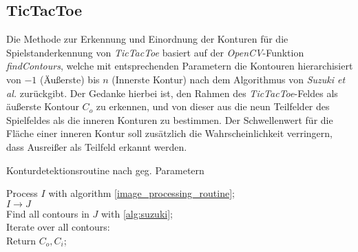 \subsection{TicTacToe}
Die Methode zur Erkennung und Einordnung der Konturen für die Spielstanderkennung von \textit{TicTacToe} basiert auf der \textit{OpenCV}-Funktion \textit{findContours}, welche mit entsprechenden Parametern die Kontouren hierarchisiert von $-1$ (Äußerste) bis $n$ (Innerste Kontur) nach dem Algorithmus von \textit{Suzuki et al.} zurückgibt. Der Gedanke hierbei ist, den Rahmen des \textit{TicTacToe}-Feldes als äußerste Kontour $C_o$ zu erkennen, und von dieser aus die neun Teilfelder des Spielfeldes als die inneren Konturen zu bestimmen. Der Schwellenwert für die Fläche einer inneren Kontur soll zusätzlich die Wahrscheinlichkeit verringern, dass \dq Ausreißer \dq als Teilfeld erkannt werden.

\begin{algorithm}[!htbp]
    \LinesNumbered
    \SetAlgoLined
    \caption{Konturdetektionsroutine nach geg. Parametern}\label{alg:contour}
    Process $I$ with algorithm \vref{image_processing_routine};\\
    $I \rightarrow J$\\
    Find all contours in $J$ with \vref{alg:suzuki};\\
    Iterate over all contours:\\
    Return $C_o, C_i$;\\
\end{algorithm}

